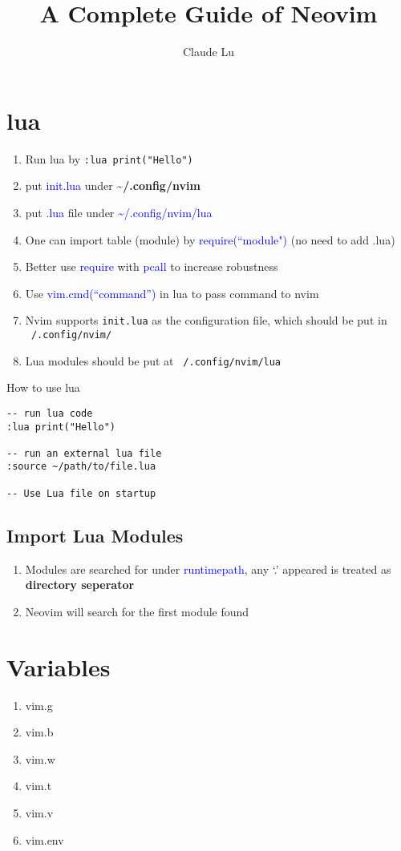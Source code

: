\documentclass[12pt,a4paper]{article}
\title{A Complete Guide of Neovim}
\author{Claude Lu}
\newcommand{\bt}[1]{\textcolor{blue}{#1}}
\begin{document}
\maketitle

\section{lua}
\begin{enumerate}
	\item Run lua by \texttt{:lua print("Hello")}
	\item put \bt{init.lua} under \textbf{\textasciitilde/.config/nvim}
	\item put \bt{.lua} file under \bt{\textasciitilde/.config/nvim/lua}
	\item One can import table (module) by \bt{require(``module")} (no need to add .lua)
	\item Better use \bt{require} with \bt{pcall} to increase robustness
	\item Use \bt{vim.cmd(``command'')} in lua to pass command to nvim
	\item Nvim supports \texttt{init.lua} as the configuration file, which should be put in \texttt{~/.config/nvim/}
	\item Lua modules should be put at \texttt{~/.config/nvim/lua}
\end{enumerate}
How to use lua
\begin{footnotesize}
\begin{verbatim}
-- run lua code
:lua print("Hello")

-- run an external lua file
:source ~/path/to/file.lua

-- Use Lua file on startup

\end{verbatim}
\end{footnotesize}

\subsection{Import Lua Modules}
\begin{enumerate}
	\item Modules are searched for under \bt{runtimepath}, any `\bt{.}' appeared is treated as \textbf{directory seperator}
	\item Neovim will search for the first module found
\end{enumerate}

\section{Variables}
\begin{enumerate}
	\item vim.g
	\item vim.b
	\item vim.w
	\item vim.t
	\item vim.v
	\item vim.env
\end{enumerate}
\end{document}
